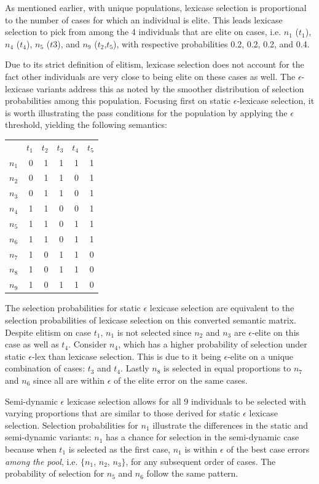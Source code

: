 \documentclass[preprint]{article}
\begin{document}
As mentioned earlier, with unique populations, lexicase selection is proportional to the number of cases for which an individual is elite. This leads lexicase selection to pick from among the 4 individuals that are elite on cases, i.e. $n_1$ ($t_1$), $n_4$ ($t_4$), $n_5$ ($t3$), and $n_9$ ($t_2$,$t_5$), with respective probabilities 0.2, 0.2, 0.2, and 0.4. 

Due to its strict definition of elitism, lexicase selection does not account for the fact other individuals are very close to being elite on these cases as well. The $\epsilon$-lexicase variants address this as noted by the smoother distribution of selection probabilities among this population. Focusing first on static $\epsilon$-lexicase selection, it is worth illustrating the pass conditions for the population by applying the $\epsilon$ threshold, yielding the following semantics:

\begin{center}
\begin{tabular}{lrrrrr}
& $t_1$ & $t_2$ & $t_3$ & $t_4$ & $t_5$ \\
$n_1$	&0	&	1	&	1	&	1	&	1\\ 
$n_2$	&0	&	1	&	1	&	0	&	1\\ 
$n_3$	&0	&	1	&	1	&	0	&	1\\ 
$n_4$	&1	&	1	&	0	&	0	&	1\\ 
$n_5$	&1	&	1	&	0	&	1	&	1\\ 
$n_6$	&1	&	1	&	0	&	1	&	1\\ 
$n_7$	&1	&	0	&	1	&	1	&	0\\ 
$n_8$	&1	&	0	&	1	&	1	&	0\\ 
$n_9$	&1	&	0	&	1	&	1	&	0\\ 
\end{tabular}
\end{center}
 
The selection probabilities for static $\epsilon$ lexicase selection are equivalent to the selection probabilities of lexicase selection on this converted semantic matrix. Despite elitism on case $t_1$, $n_1$ is not selected since $n_2$ and $n_3$ are $\epsilon$-elite on this case as well as $t_4$. Consider $n_4$, which has a higher probability of selection under static $\epsilon$-lex than lexicase selection. This is due to it being $\epsilon$-elite on a unique combination of cases: $t_3$ and $t_4$. Lastly $n_8$ is selected in equal proportions to $n_7$ and $n_6$ since all are within $\epsilon$ of the elite error on the same cases. 

Semi-dynamic $\epsilon$ lexicase selection allows for all 9 individuals to be selected with varying proportions that are similar to those derived for static $\epsilon$ lexicase selection. Selection probabilities for $n_1$ illustrate the differences in the static and semi-dynamic variants: $n_1$ has a chance for selection in the semi-dynamic case because when $t_1$ is selected as the first case, $n_1$ is within $\epsilon$ of the best case errors {\it among the pool}, i.e. $\{n_1$, $n_2$, $n_3\}$, for any subsequent order of cases. The probability of selection for $n_5$ and $n_6$ follow the same pattern.
\end{document}
